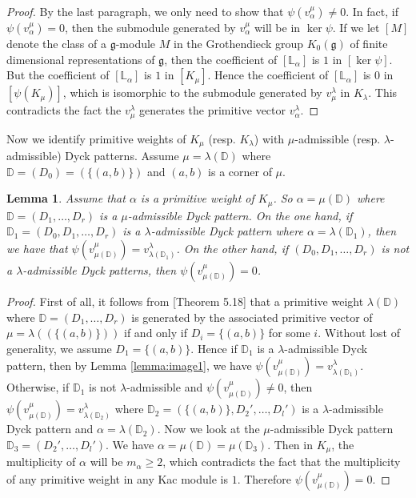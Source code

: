 \documentclass[12pt]{amsart}
\newtheorem{lem}[thm]{Lemma}
\theoremstyle{definition}
\theoremstyle{remark}
\newcommand{\bbD}{\mathbb{D}}
\newcommand{\bbL}{\mathbb{L}}
\newcommand{\fg}{\mathfrak{g}}
\numberwithin{equation}{section}
\begin{document}
\begin{proof}
By the last paragraph, we only need to show that $\psi(v_{\alpha}^{\mu}) \neq 0$. In fact, if $\psi(v_{\alpha}^{\mu}) = 0$, then the submodule generated by $v_{\alpha}^{\mu}$ will be in $\ker \psi$. If we let $[M]$ denote the class of a $\fg$-module $M$ in the Grothendieck group $K_0(\fg)$ of finite dimensional representations of $\fg$, then the coefficient of $[\bbL_{\alpha}]$ is $1$ in $[\ker \psi]$. But the coefficient of $[\bbL_{\alpha}]$ is $1$ in $[K_{\mu}]$. Hence the coefficient of $[\bbL_{\alpha}]$ is $0$ in $[\psi(K_{\mu})]$, which is isomorphic to the submodule generated by $v_{\mu}^{\lambda}$ in $K_{\lambda}$. This contradicts the fact the $v_{\mu}^{\lambda}$ generates the primitive vector $v_{\alpha}^{\lambda}$. 
\end{proof}

Now we identify primitive weights of $K_{\mu}$ (resp. $K_{\lambda}$) with $\mu$-admissible (resp. $\lambda$-admissible) Dyck patterns. Assume $\mu = \lambda(\bbD)$ where $\bbD = (D_0) = (\{(a,b)\})$ and $(a,b)$ is a corner of $\mu$. 

\begin{lem} \label{lemma:image}
Assume that $\alpha$ is a primitive weight of $K_{\mu}$. So $\alpha = \mu(\bbD)$ where $\bbD = (D_1,\ldots,D_r)$ is a $\mu$-admissible Dyck pattern. On the one hand, if  $\bbD_1 = (D_0,D_1,\ldots,D_r)$ is a $\lambda$-admissible Dyck pattern where $\alpha = \lambda(\bbD_1)$, then we have that $\psi(v_{\mu(\bbD)}^{\mu}) = v_{\lambda(\bbD_1)}^{\lambda}$.  On the other hand, if $(D_0,D_1,\ldots,D_r)$ is not a $\lambda$-admissible Dyck patterns, then $\psi(v_{\mu(\bbD)}^{\mu}) = 0$. 
\end{lem}

\begin{proof}
First of all, it follows from \cite{SZ}[Theorem 5.18] that a primitive weight $\lambda(\bbD)$ where $\bbD = (D_1,\ldots,D_r)$ is generated by the associated primitive vector of $\mu = \lambda((\{ (a,b) \}))$ if and only if $D_i = \{ (a,b) \}$ for some $i$. Without lost of generality, we assume $D_1 = \{ (a,b) \}$.  Hence if $\bbD_1$ is a $\lambda$-admissible Dyck pattern, then by Lemma \ref{lemma:image1}, we have $\psi(v_{\mu(\bbD)}^{\mu}) = v_{\lambda(\bbD_1)}^{\lambda}$. Otherwise, if $\bbD_1$ is not $\lambda$-admissible and $\psi(v_{\mu(\bbD)}^{\mu}) \neq 0$, then $\psi(v_{\mu(\bbD)}^{\mu}) = v_{\lambda(\bbD_2)}^{\lambda}$ where $\bbD_2 = (\{ (a,b) \},D_2',\ldots,D_l')$ is a $\lambda$-admissible Dyck pattern and $\alpha = \lambda(\bbD_2)$. Now we look at the $\mu$-admissible Dyck pattern $\bbD_3 = (D_2',\ldots,D_l')$. We have $\alpha = \mu(\bbD) = \mu(\bbD_3)$. Then in $K_{\mu}$, the multiplicity of $\alpha$ will be $m_{\alpha} \geq 2$, which contradicts the fact that the multiplicity of any primitive weight in any Kac module is $1$. Therefore $\psi(v_{\mu(\bbD)}^{\mu}) = 0$.
\end{proof}
\end{document}
